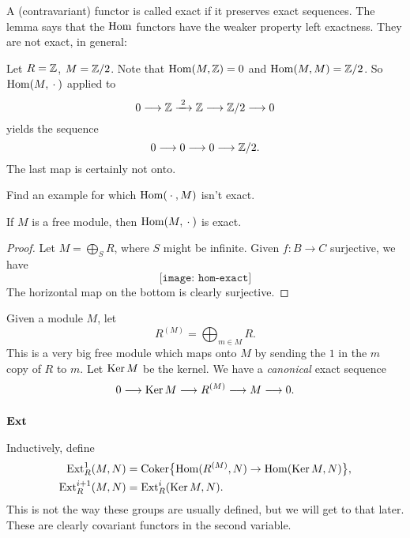 A (contravariant) functor is called exact if it preserves exact
sequences. The lemma says that the \(\operatorname{Hom}\) functors have the weaker
property left exactness. They are not exact, in general:

\begin{example}
  Let \(R=\mathbb{Z}\), \(M=\mathbb{Z}/2\). Note that \(\operatorname{Hom}(M,\mathbb{Z})=0\) and
  \(\operatorname{Hom}(M,M)=\mathbb{Z}/2\). So \(\operatorname{Hom}(M,{}\cdot{})\) applied to
  \[0\longrightarrow\mathbb{Z}\xrightarrow{\,\,2\,\,}\mathbb{Z}\longrightarrow\mathbb{Z}/2\longrightarrow 0\]
  yields the sequence
  \[0\longrightarrow 0\longrightarrow 0\longrightarrow\mathbb{Z}/2.\]
  The last map is certainly not onto.
\end{example}

\begin{exercise}
  Find an example for which \(\operatorname{Hom}({}\cdot{},M)\) isn't exact.
\end{exercise}

\begin{lemma}
  If \(M\) is a free module, then \(\operatorname{Hom}(M,{}\cdot{})\) is exact.
\end{lemma}
\begin{proof}
  Let \(M=\bigoplus_S R\), where \(S\) might be infinite. Given \(f\colon
  B\to C\) surjective, we have
  \[
    \texttt{[image: hom-exact]}
  \]
  The horizontal map on the bottom is clearly surjective.
\end{proof}

Given a module \(M\), let
\[
  R^{(M)}=\bigoplus_{m\in M} R.
\]
This is a very big free module which maps onto \(M\) by sending the \(1\)
in the \(m\) copy of \(R\) to \(m\). Let \(\operatorname{Ker} M\) be the
kernel. We have a \emph{canonical} exact sequence
\begin{equation}
  \label{eq:alggeom:canonical-exact-seq}
  0\longrightarrow\operatorname{Ker} M\longrightarrow R^{(M)}\longrightarrow M\longrightarrow 0.
\end{equation}
\subsection[\(\Ext\)]{\(\boldsymbol{\operatorname{Ext}}\)}
Inductively, define
\begin{align*}
  \operatorname{Ext}^1_R(M,N)
  &=\operatorname{Coker}\bigl\{\operatorname{Hom}(R^{(M)},N)\to\operatorname{Hom}(\operatorname{Ker} M,N)\bigr\},\\
  \operatorname{Ext}_R^{i+1}(M,N)
  &=\operatorname{Ext}_R^i(\operatorname{Ker} M,N).
\end{align*}
This is not the way these groups are usually defined, but we will get to
that later. These are clearly covariant functors in the second variable.

